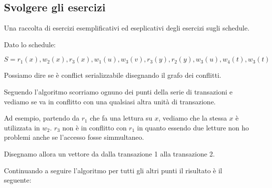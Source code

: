 \subsection{Svolgere gli esercizi}

Una raccolta di esercizi esemplificativi ed eseplicativi degli esercizi sugli schedule.

\begin{exmp}
    Dato lo schedule:

    \[S = r_1(x), w_2(x), r_3(x), w_1(u), w_3(v), r_3(y), r_2(y), w_3(u), w_4(t), w_3(t)\]

    Possiamo dire se è conflict serializzabile disegnando il grafo dei conflitti.

    Seguendo l'algoritmo scorriamo ognuno dei punti della serie di transazioni e vediamo se va in conflitto con una qualsiasi altra unità di transazione.

    Ad esempio, partendo da \textbf{$r_1$} che fa una lettura su \textbf{$x$}, vediamo che la stessa \textbf{$x$} è utilizzata in \textbf{$w_2$}. \textbf{$r_3$} non è in conflitto con \textbf{$r_1$} in quanto essendo due letture non ho problemi anche se l'accesso fosse simmultaneo.

    Disegnamo allora un vettore da dalla transazione 1 alla transazione 2.
    \begin{center}
    \end{center}

    Continuando a seguire l'algoritmo per tutti gli altri punti il risultato è il seguente:
    \begin{center}
    \end{center}


\end{exmp}
